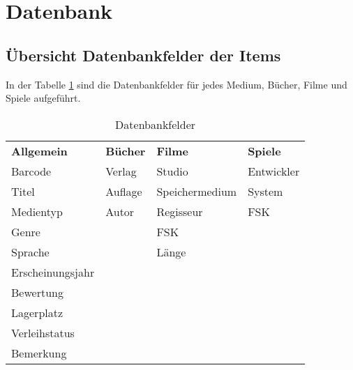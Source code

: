 \section{Datenbank}

\subsection{Übersicht Datenbankfelder der Items}
\label{sec:Felder}

In der Tabelle \ref{tab:Datenbankfelder}  sind die Datenbankfelder für jedes Medium, Bücher, Filme und Spiele aufgeführt.

\begin{table} [htbp]
	\begin{center}
		\begin{tabular}{|l|l|l|l|}
			\rowcolor{black} {\color{white}\textbf{Allgemein}} & {\color{white}\textbf{Bücher}} & {\color{white}\textbf{Filme}} & {\color{white}\textbf{Spiele}} \\
			Barcode & Verlag & Studio & Entwickler\\ \hline
			\rowcolor{DarkSeaGreen} Titel & Auflage & Speichermedium & System \\ \hline			Medientyp & Autor& Regisseur & FSK \\ \hline
			\rowcolor{DarkSeaGreen} Genre & & FSK & \\ \hline
			Sprache & & Länge & \\ \hline
			\rowcolor{DarkSeaGreen} Erscheinungsjahr & & & \\ \hline
			Bewertung & & & \\ \hline
			\rowcolor{DarkSeaGreen} Lagerplatz & & & \\ \hline
			Verleihstatus & & & \\ \hline
			\rowcolor{DarkSeaGreen} Bemerkung & & & \\ \hline		
		\end{tabular}
	\caption{Datenbankfelder}
	\label{tab:Datenbankfelder}
	\end{center}
\end{table}